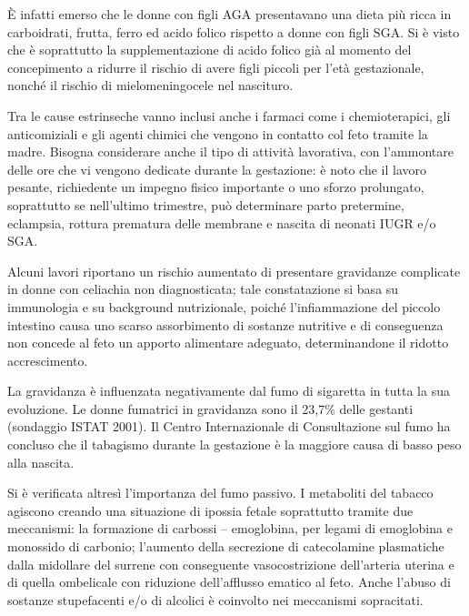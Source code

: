 \`E infatti emerso che le donne con figli AGA presentavano una dieta più ricca in carboidrati,
frutta, ferro ed acido folico rispetto a donne con figli SGA. Si è visto che è soprattutto la
supplementazione di acido folico già al momento del concepimento a ridurre il rischio di 
avere figli piccoli per l'età gestazionale, nonché il rischio di mielomeningocele nel nascituro.\cite{sga-26}


Tra le cause estrinseche vanno inclusi anche i farmaci come i chemioterapici, gli anticomiziali
e gli agenti chimici che vengono in contatto col feto tramite la madre.
Bisogna considerare anche il tipo di attivit\`a lavorativa, con l'ammontare delle ore
che vi vengono dedicate durante la gestazione: \`e noto che il lavoro pesante, 
richiedente un impegno fisico importante o uno sforzo prolungato, soprattutto se nell'ultimo trimestre,
può determinare parto pretermine, eclampsia, rottura prematura delle membrane e nascita di 
neonati IUGR e/o SGA\cite{sga-14}.


Alcuni lavori riportano un rischio aumentato di presentare gravidanze complicate
in donne con celiachia non diagnosticata; tale constatazione si basa su immunologia e 
su background nutrizionale, poich\'e l'infiammazione del piccolo intestino causa uno
scarso assorbimento di sostanze nutritive e di conseguenza non concede al feto un apporto alimentare adeguato,
determinandone il ridotto accrescimento\cite{sga-15}.


La gravidanza \`e influenzata negativamente dal fumo di sigaretta in tutta la sua evoluzione.
Le donne fumatrici in gravidanza sono il 23,7\% delle gestanti (sondaggio ISTAT 2001).
Il Centro Internazionale di Consultazione sul fumo ha concluso che il tabagismo durante la gestazione
\`e la maggiore causa di basso peso alla nascita\cite{sga-18}.


Si \`e verificata altres\`i l'importanza del fumo passivo. I metaboliti del tabacco agiscono creando
una situazione di ipossia fetale soprattutto tramite due meccanismi: la formazione di carbossi -- emoglobina, 
per legami di emoglobina e monossido di carbonio; l'aumento della secrezione di catecolamine plasmatiche
dalla midollare del surrene con conseguente vasocostrizione dell'arteria uterina e di quella ombelicale
con riduzione dell'afflusso ematico al feto\cite{sga-20}.
Anche l'abuso di sostanze stupefacenti e/o di alcolici è coinvolto nei meccanismi sopracitati\cite{sga-24}\cite{sga-25}.


